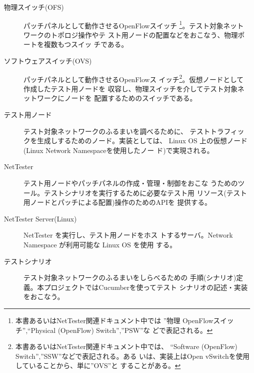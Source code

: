 
\begin{description}
 \item[物理スイッチ(OFS)] パッチパネルとして動作させるOpenFlowスイッチ
            \footnote{本書あるいはNetTester関連ドキュメント中では ''物理
            OpenFlowスイッチ'',``Physical (OpenFlow) Switch'',''PSW''な
            どで表記される。}。テスト対象ネットワークのトポロジ操作やテ
            スト用ノードの配置などをおこなう、物理ポートを複数もつスイッ
            チである。
 \item[ソフトウェアスイッチ(OVS)] パッチパネルとして動作させるOpenFlowス
            イッチ\footnote{本書あるいはNetTester関連ドキュメント中では、
            ``Software (OpenFlow) Switch'',''SSW''などで表記される。ある
            いは、実装上はOpen vSwitchを使用していることから、単に''OVS''と
            することがある。}。仮想ノードとして作成したテスト用ノードを
            収容し、物理スイッチを介してテスト対象ネットワークにノードを
            配置するためのスイッチである。
 \item[テスト用ノード] テスト対象ネットワークのふるまいを調べるために、
            テストトラフィックを生成しするためのノード。実装としては、
            Linux OS 上の仮想ノード(Linux Network Namespaceを使用したノー
            ド)で実現される。
 \item[NetTester] テスト用ノードやパッチパネルの作成・管理・制御をおこな
            うためのツール。テストシナリオを実行するために必要なテスト用
            リソース(テスト用ノードとパッチによる配置)操作のためのAPIを
            提供する。
 \item[NetTester Server(Linux)] NetTester を実行し、テスト用ノードをホス
            トするサーバ。Network Namespace が利用可能な Linux OS を使用
            する。
 \item[テストシナリオ] テスト対象ネットワークのふるまいをしらべるための
            手順(シナリオ)定義。本プロジェクトではCucumberを使ってテスト
            シナリオの記述・実装をおこなう。
\end{description}

